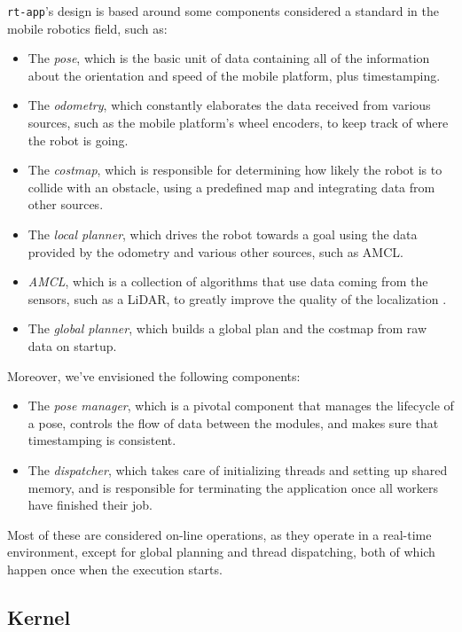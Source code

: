 \documentclass[a4paper,12pt]{report}
\begin{document}
\texttt{rt-app}'s design is based around some components considered a standard in the mobile robotics field, such as:
\begin{itemize}
    \item The \textit{pose}, which is the basic unit of data containing all of the information about the orientation and speed of the mobile platform, plus timestamping.
    \item The \textit{odometry}, which constantly elaborates the data received from various sources, such as the mobile platform's wheel encoders, to keep track of where the robot is going.
    \item The \textit{costmap}, which is responsible for determining how likely the robot is to collide with an obstacle, using a predefined map and integrating data from other sources.
    \item The \textit{local planner}, which drives the robot towards a goal using the data provided by the odometry and various other sources, such as AMCL.
    \item \textit{AMCL}, which is a collection of algorithms that use data coming from the sensors, such as a LiDAR, to greatly improve the quality of the localization \cite{roswiki-amcl}.
    \item The \textit{global planner}, which builds a global plan and the costmap from raw data on startup.
\end{itemize}

Moreover, we've envisioned the following components:
\begin{itemize}
  \item The \textit{pose manager}, which is a pivotal component that manages the lifecycle of a pose, controls the flow of data between the modules, and makes sure that timestamping is consistent.
  \item The \textit{dispatcher}, which takes care of initializing threads and setting up shared memory, and is responsible for terminating the application once all workers have finished their job.
\end{itemize}

Most of these are considered on-line operations, as they operate in a real-time environment, except for global planning and thread dispatching, both of which happen once when the execution starts.

\subsection{Kernel}
\end{document}
